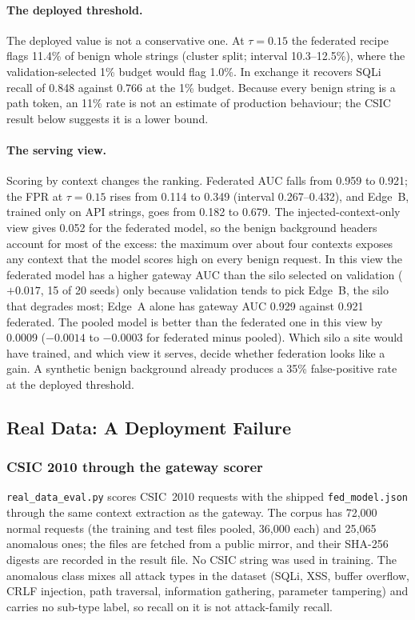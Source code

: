 \paragraph{The deployed threshold.}
The deployed value is not a conservative one. At $\tau=0.15$ the federated recipe flags 11.4\% of benign whole strings (cluster split; interval 10.3--12.5\%), where the validation-selected 1\% budget would flag 1.0\%. In exchange it recovers SQLi recall of 0.848 against 0.766 at the 1\% budget. Because every benign string is a path token, an 11\% rate is not an estimate of production behaviour; the CSIC result below suggests it is a lower bound.

\paragraph{The serving view.}
Scoring by context changes the ranking. Federated AUC falls from 0.959 to 0.921; the FPR at $\tau=0.15$ rises from 0.114 to 0.349 (interval 0.267--0.432), and Edge~B, trained only on API strings, goes from 0.182 to 0.679. The injected-context-only view gives 0.052 for the federated model, so the benign background headers account for most of the excess: the maximum over about four contexts exposes any context that the model scores high on every benign request. In this view the federated model has a higher gateway AUC than the silo selected on validation ($+0.017$, 15 of 20 seeds) only because validation tends to pick Edge~B, the silo that degrades most; Edge~A alone has gateway AUC 0.929 against 0.921 federated. The pooled model is better than the federated one in this view by 0.0009 ($-0.0014$ to $-0.0003$ for federated minus pooled). Which silo a site would have trained, and which view it serves, decide whether federation looks like a gain. A synthetic benign background already produces a 35\% false-positive rate at the deployed threshold.

\subsection{Real Data: A Deployment Failure}
\label{sec:eval-real}

\subsubsection*{CSIC 2010 through the gateway scorer}


\texttt{real\_data\_eval.py} scores CSIC~2010 requests with the shipped \texttt{fed\_model.json} through the same context extraction as the gateway. The corpus has 72{,}000 normal requests (the training and test files pooled, 36{,}000 each) and 25{,}065 anomalous ones; the files are fetched from a public mirror, and their SHA-256 digests are recorded in the result file. No CSIC string was used in training. The anomalous class mixes all attack types in the dataset (SQLi, XSS, buffer overflow, CRLF injection, path traversal, information gathering, parameter tampering) and carries no sub-type label, so recall on it is not attack-family recall.

